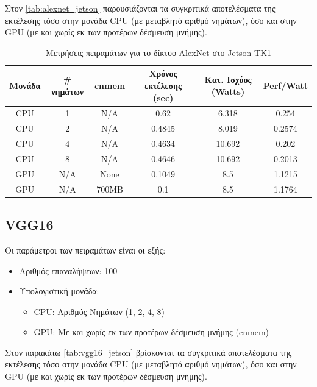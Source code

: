Στον \autoref{tab:alexnet_jetson} παρουσιάζονται τα συγκριτικά αποτελέσματα της
εκτέλεσης τόσο στην μονάδα CPU (με μεταβλητό αριθμό νημάτων), όσο και στην
GPU (με και χωρίς εκ των προτέρων δέσμευση μνήμης).

\begin{table}[H]
  \begin{center}
    \caption{Μετρήσεις πειραμάτων για το δίκτυο AlexNet στο Jetson TK1}
    \label{tab:alexnet_jetson}
    \small
    \begin{tabular}[center]{ | c | c | c | c | c | c | }
      \hline
      \rowcolor{Gray}
      Μονάδα & \# νημάτων & cnmem & Χρόνος εκτέλεσης (sec) & Κατ. Ισχύος (Watts) & Perf/Watt \\
      \hline
      CPU & 1 & N/A & 0.62 & 6.318 & 0.254\\
      CPU & 2 & N/A & 0.4845 & 8.019 & 0.2574\\
      CPU & 4 & N/A & 0.4634 & 10.692 & 0.202\\
      CPU & 8 & N/A & 0.4646 & 10.692 & 0.2013\\
      GPU & N/A & None & 0.1049 & 8.5 & 1.1215\\
      GPU & N/A & 700MB & 0.1 & 8.5 & 1.1764\\
      \hline
    \end{tabular}
  \end{center}
\end{table}



\subsection{VGG16}

Οι παράμετροι των πειραμάτων είναι οι εξής:
\begin{itemize}
  \item{Αριθμός επαναλήψεων: 100}
  \item{Υπολογιστική μονάδα:}
    \begin{itemize}
      \item{CPU: Αριθμός Νημάτων (1, 2, 4, 8)}
      \item{GPU: Με και χωρίς εκ των προτέρων δέσμευση μνήμης (cnmem)}
    \end{itemize}
\end{itemize}

Στον παρακάτω \autoref{tab:vgg16_jetson} βρίσκονται τα συγκριτικά αποτελέσματα της
εκτέλεσης τόσο στην μονάδα CPU (με μεταβλητό αριθμό νημάτων), όσο και στην
GPU (με και χωρίς εκ των προτέρων δέσμευση μνήμης).

